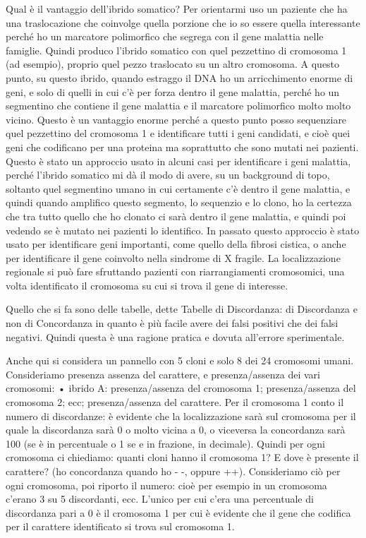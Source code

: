 \documentclass[11pt]{book}
\begin{document}
Qual è il vantaggio dell’ibrido somatico?
Per orientarmi uso un paziente che ha una traslocazione che coinvolge quella porzione che io so essere quella interessante perché ho un marcatore polimorfico che segrega con il gene malattia nelle famiglie. 
Quindi produco l’ibrido somatico con quel pezzettino di cromosoma 1 (ad esempio), proprio quel pezzo traslocato su un altro cromosoma.
A questo punto, su questo ibrido, quando estraggo il DNA ho un arricchimento enorme di geni, e solo di quelli in cui c’è per forza dentro il gene malattia, perché ho un segmentino che contiene il gene malattia e il marcatore polimorfico molto molto vicino. Questo è un vantaggio enorme perché a questo punto posso sequenziare quel pezzettino del cromosoma 1 e identificare tutti i geni candidati, e cioè quei geni che codificano per una proteina ma soprattutto che sono mutati nei pazienti.
Questo è stato un approccio usato in alcuni casi per identificare i geni malattia, perché l’ibrido somatico mi dà il modo di avere, su un background di topo, soltanto quel segmentino umano in cui certamente c’è dentro il gene malattia, e quindi quando amplifico questo segmento, lo sequenzio e lo clono, ho la certezza che tra tutto quello che ho clonato ci sarà dentro il gene malattia, e quindi poi vedendo se è mutato nei pazienti lo identifico.
In passato questo approccio è stato usato per identificare geni importanti, come quello della fibrosi cistica, o anche per identificare il gene coinvolto nella sindrome di X fragile.
La localizzazione regionale si può fare sfruttando pazienti con riarrangiamenti cromosomici, una volta identificato il cromosoma su cui si trova il gene di interesse.

Quello che si fa sono delle tabelle, dette Tabelle di Discordanza: di Discordanza e non di Concordanza in quanto è più facile avere dei falsi positivi che dei falsi negativi. Quindi questa è una ragione pratica e dovuta all’errore sperimentale.


Anche qui si considera un pannello con 5 cloni e solo 8 dei 24 cromosomi umani. Consideriamo presenza assenza del carattere, e presenza/assenza dei vari cromosomi:
    • ibrido A: presenza/assenza del cromosoma 1; presenza/assenza del cromosoma 2; ecc; presenza/assenza del carattere.
      Per il cromosoma 1 conto il numero di discordanze: è evidente che la localizzazione sarà sul cromosoma per il quale la discordanza sarà 0 o molto vicina a 0, o viceversa la concordanza sarà 100 (se è in percentuale o 1 se e in frazione, in decimale). 
Quindi per ogni cromosoma ci chiediamo: quanti cloni hanno il cromosoma 1? E dove è presente il carattere? (ho concordanza quando ho - -, oppure ++).
Consideriamo ciò per ogni cromosoma, poi riporto il numero: cioè per esempio in un cromosoma c’erano 3 su 5 discordanti, ecc. L’unico per cui c’era una percentuale di discordanza pari a 0 è il cromosoma 1 per cui è evidente che il gene che codifica per il carattere identificato si trova sul cromosoma 1.
\end{document}
